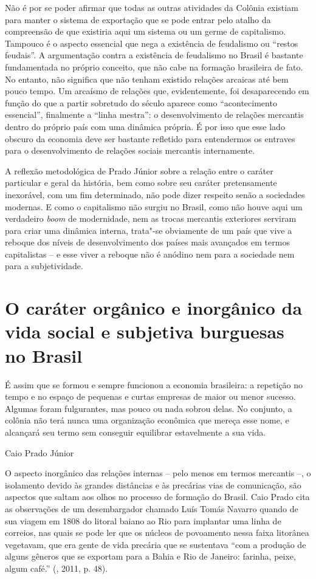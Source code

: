 {Não é por se poder afirmar que todas as outras atividades da Colônia
existiam para manter o sistema de exportação que se pode entrar pelo
atalho da compreensão de que existiria aqui um sistema ou um germe de
capitalismo. Tampouco é o aspecto essencial que nega a existência de
feudalismo ou ``restos feudais''. A argumentação contra a existência de
feudalismo no Brasil é bastante fundamentada no próprio conceito, que
não cabe na formação brasileira de fato. No entanto, não significa que
não tenham existido relações arcaicas até bem pouco tempo. Um arcaísmo
de relações que, evidentemente, foi desaparecendo em função do que a
partir sobretudo do século  aparece como ``acontecimento essencial'',
finalmente a ``linha mestra'': o desenvolvimento de relações mercantis dentro do
próprio país com uma dinâmica própria. É por isso que esse lado obscuro
da economia deve ser bastante refletido para entendermos os entraves
para o desenvolvimento de relações sociais mercantis internamente.

A reflexão metodológica de Prado Júnior sobre a relação entre o caráter
particular e geral da história, bem como sobre seu caráter pretensamente
inexorável, com um fim determinado, não pode dizer respeito senão a
sociedades modernas. E como o capitalismo não surgiu no Brasil, como não
houve aqui um verdadeiro \emph{boom} de modernidade, nem as trocas
mercantis exteriores serviram para criar uma dinâmica interna, trata"-se
obviamente de um país que vive a reboque dos níveis de desenvolvimento
dos países mais avançados em termos capitalistas -- e esse viver a
reboque não é anódino nem para a sociedade nem para a subjetividade.

\section{O caráter orgânico e inorgânico da vida social e subjetiva burguesas no Brasil}

\epigraph{É assim que se formou e sempre funcionou a economia brasileira: a
repetição no tempo e no espaço de pequenas e curtas empresas de maior ou
menor sucesso. Algumas foram fulgurantes, mas pouco ou nada sobrou
delas. No conjunto, a colônia não terá nunca uma organização econômica
que mereça esse nome, e alcançará seu termo sem conseguir equilibrar
estavelmente a sua vida.}{Caio Prado Júnior}


O aspecto inorgânico das relações internas -- pelo menos em termos
mercantis --, o isolamento devido às grandes distâncias e às precárias
vias de comunicação, são aspectos que saltam aos olhos no processo de
formação do Brasil. Caio Prado cita as observações de um desembargador
chamado Luís Tomás Navarro quando de sua viagem em 1808 do litoral
baiano ao Rio para implantar uma linha de correios, nas quais se pode
ler que os núcleos de povoamento nessa faixa litorânea vegetavam, que
era gente de vida precária que se sustentava ``com a produção de alguns
gêneros que se exportam para a Bahia e Rio de Janeiro: farinha, peixe,
algum café.'' (, 2011, p. 48).

}
